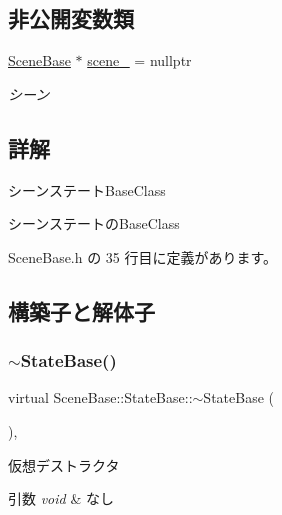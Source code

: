 \subsection*{非公開変数類}
\begin{DoxyCompactItemize}
\item 
\mbox{\hyperlink{class_scene_base}{Scene\+Base}} $\ast$ \mbox{\hyperlink{class_scene_base_1_1_state_base_ae1062afb3f96664e24504151eaccf40f}{scene\+\_\+}} = nullptr
\begin{DoxyCompactList}\small\item\em シーン \end{DoxyCompactList}\end{DoxyCompactItemize}


\subsection{詳解}
シーンステート\+Base\+Class 

シーンステートの\+Base\+Class 

 Scene\+Base.\+h の 35 行目に定義があります。



\subsection{構築子と解体子}
\mbox{\label{class_scene_base_1_1_state_base_afc993757f908babc872063e1e2465e3e}} 
\subsubsection{\texorpdfstring{$\sim$\+State\+Base()}{~StateBase()}}
{\footnotesize\ttfamily virtual Scene\+Base\+::\+State\+Base\+::$\sim$\+State\+Base (\begin{DoxyParamCaption}{ }\end{DoxyParamCaption})\hspace{0.3cm}{\ttfamily [inline]}, {\ttfamily [virtual]}}



仮想デストラクタ 


\begin{DoxyParams}{引数}
{\em void} & なし \\
\hline
\end{DoxyParams}


